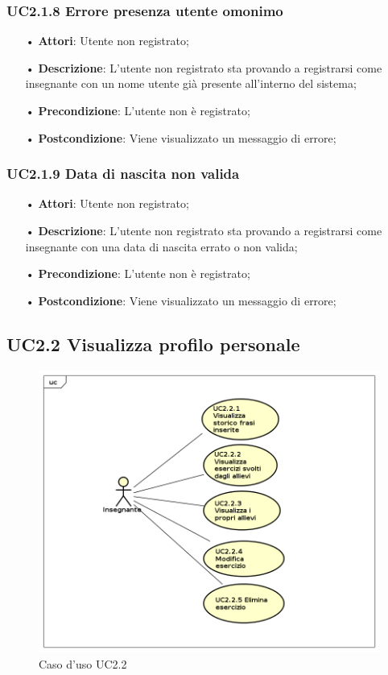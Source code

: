 \subsubsection{UC2.1.8 Errore presenza utente omonimo}
\begin{itemize}
	\item[•] \textbf{Attori}: Utente non registrato;
	\item[•] \textbf{Descrizione}:  L'utente non registrato sta provando a registrarsi come insegnante con un nome utente già presente all'interno del sistema;
	\item[•] \textbf{Precondizione}: L’utente non è registrato;
	\item[•] \textbf{Postcondizione}: Viene visualizzato un messaggio di errore;
\end{itemize}

\subsubsection{UC2.1.9 Data di nascita non valida}
\begin{itemize}
	\item[•] \textbf{Attori}: Utente non registrato;
	\item[•] \textbf{Descrizione}: L'utente non registrato sta provando a registrarsi come insegnante con una data di nascita errato o non valida;
	\item[•] \textbf{Precondizione}: L’utente non è registrato;
	\item[•] \textbf{Postcondizione}: Viene visualizzato un messaggio di errore;
\end{itemize}


\subsection{UC2.2 Visualizza profilo personale}

\begin{figure}[H]
\centering
\includegraphics[width=14cm]{img/UC22.png} 
\caption{Caso d'uso UC2.2}
\end{figure}

